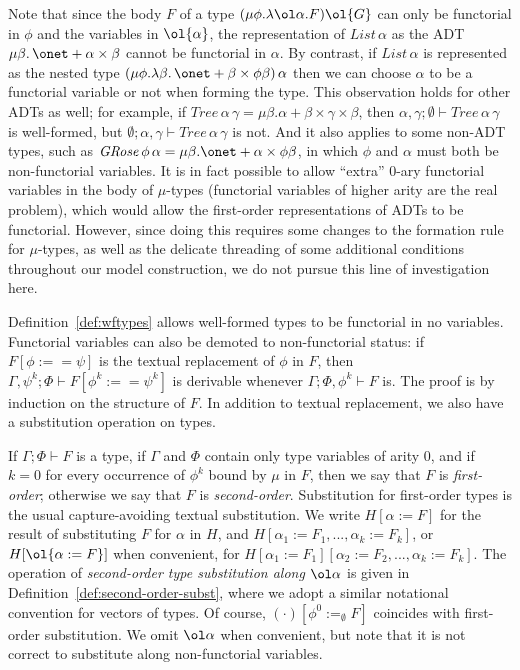 \documentclass{lmcs}
\theoremstyle{plain}\newtheorem{satz}[thm]{Satz}
\begin{document}
Note that since the body $F$ of a type $(\mu \phi. \lambda
\ol\alpha. F)\ol{G}$ can only be functorial in $\phi$ and the
variables in $\ol{\alpha}$, the representation of
$\mathit{List}\,\alpha$ as the ADT $\mu \beta. \,\onet + \alpha \times
\beta$ cannot be functorial in $\alpha$. By contrast, if
$\mathit{List}\,\alpha$ is represented as the nested type $(\mu
\phi. \lambda \beta.\,\onet + \beta \times \phi \beta)\,\alpha$ then
we can choose $\alpha$ to be a functorial variable or not when forming
the type. This observation holds for other ADTs as well; for example,
if $\mathit{Tree}\,\alpha\,\gamma = \mu \beta. \alpha + \beta \times
\gamma \times \beta$, then $\alpha, \gamma; \emptyset \vdash
\mathit{Tree}\,\alpha\,\gamma$ is well-formed, but $\emptyset; \alpha,
\gamma \vdash \mathit{Tree}\,\alpha\,\gamma$ is not. And it also
applies to some non-ADT types, such as $\mathit{GRose}\,\phi\,\alpha =
\mu \beta. \onet + \alpha \times \phi\beta$, in which $\phi$ and
$\alpha$ must both be non-functorial variables.  It is in fact
possible to allow ``extra'' $0$-ary functorial variables in the body
of $\mu$-types (functorial variables of higher arity are the real
problem), which would allow the first-order representations of ADTs to
be functorial. However, since doing this requires some changes to the
formation rule for $\mu$-types, as well as the delicate threading of
some additional conditions throughout our model construction, we do
not pursue this line of investigation here.

Definition~\ref{def:wftypes} allows well-formed types to be functorial
in no variables. Functorial variables can also be demoted to
non-functorial status: if\,$F[\phi :== \psi]$ is the textual
replacement of $\phi$ in $F$, then $\Gamma, \psi^k; \Phi \vdash
F[\phi^k :== \psi^k]$ is derivable whenever $\Gamma; \Phi, \phi^k
\vdash F$ is. The proof is by induction on the structure of $F$. In
addition to textual replacement, we also have a substitution operation
on types.

If $\Gamma; \Phi \vdash F$ is a type, if $\Gamma$ and $\Phi$ contain
only type variables of arity $0$, and if $k=0$ for every occurrence of
$\phi^k$ bound by $\mu$ in $F$, then we say that $F$ is {\em
  first-order}; otherwise we say that $F$ is {\em
  second-order}. Substitution for first-order types is the usual
capture-avoiding textual substitution. We write $H[\alpha := F]$
for the result of substituting $F$ for $\alpha$ in $H$, and
$H[\alpha_1 := F_1,...,\alpha_k := F_k]$, or $H[\ol{\alpha := F}]$
when convenient, for $H[\alpha_1 := F_1][\alpha_2 := F_2,...,\alpha_k
  := F_k]$. The operation of {\em second-order type substitution along
  $\ol\alpha$} is given in Definition~\ref{def:second-order-subst},
where we adopt a similar notational convention for vectors of types.
Of course, $(\cdot)[\phi^0 :=_\emptyset F]$ coincides with first-order
substitution. We omit $\ol\alpha$ when convenient, but note that it
is not correct to substitute along non-functorial variables.
\end{document}
